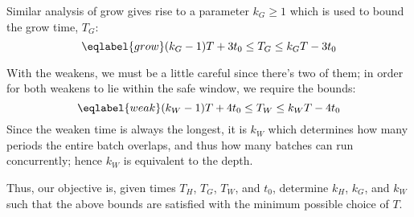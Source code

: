 \documentclass[veryplain]{notes}
\begin{document}
Similar analysis of grow gives rise to a parameter $k_G \ge 1$ which is used to bound the grow time, $T_G$:
\begin{equation}
    \eqlabel{grow}
    (k_G - 1)T + 3 t_0 \le T_G \le k_G T - 3 t_0
\end{equation}

With the weakens, we must be a little careful since there's two of them; in order for both weakens to lie within the safe window, we require the bounds:
\begin{equation}
    \eqlabel{weak}
    (k_W - 1)T + 4 t_0 \le T_W \le k_W T - 4 t_0
\end{equation}
Since the weaken time is always the longest, it is $k_W$ which determines how many periods the entire batch overlaps, and thus how many batches can run concurrently; hence $k_W$ is equivalent to the depth.

Thus, our objective is, given times $T_H$, $T_G$, $T_W$, and $t_0$, determine $k_H$, $k_G$, and $k_W$ such that the above bounds are satisfied with the minimum possible choice of $T$.
\end{document}

